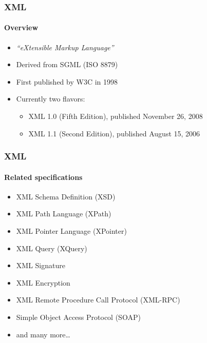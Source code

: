 \documentclass[
    alternativetitlepage=bild,
    cornerlogo=hgi_nds_logo2,
    sectionoverview,
]{rubpresentation}
\begin{document}
\begin{frame}[plain]
    \frametitle{XML}
    \framesubtitle{Overview}
    \begin{itemize}
        \item{} \emph{\enquote{eXtensible Markup Language}}\\
        \item{} Derived from SGML (ISO 8879)\\
        \item{} First published by W3C in 1998\\
        \item{} Currently two flavors:
            \begin{itemize}
                \item{} XML 1.0 (Fifth Edition), published November 26, 2008\\
                \item{} XML 1.1 (Second Edition), published August 15, 2006\\
            \end{itemize}
    \end{itemize}
\end{frame}

\begin{frame}[plain]
    \frametitle{XML}
    \framesubtitle{Related specifications}
    \begin{itemize}
        \item{} XML Schema Definition (XSD)\\
        \item{} XML Path Language (XPath)\\
        \item{} XML Pointer Language (XPointer)\\
        \item{} XML Query (XQuery)\\
        \item{} XML Signature\\
        \item{} XML Encryption\\
        \item{} XML Remote Procedure Call Protocol (XML-RPC)\\
        \item{} Simple Object Access Protocol (SOAP)
        \item{} and many more\ldots\\
    \end{itemize}
\end{frame}
\end{document}
